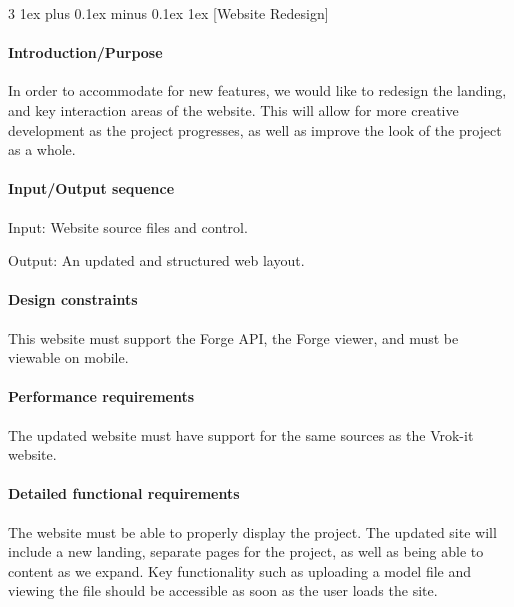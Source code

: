 \documentclass[letterpaper, 10pt, draftclsnofoot, compsoc, onecolumn]{IEEEtran}
\makeatletter
\def\subsubsection{\@startsection{subsubsection}%
                                 {3}%
                                 {\z@}%
                                 {1ex plus 0.1ex minus 0.1ex}%
                                 {1ex}%
                                 {\normalfont\normalsize}}%
\makeatother
\begin{document}

\subsubsection[{Website Redesign}]{\rmfamily\bfseries\color{black} }

\paragraph[Introduction/Purpose of this
feature]{\rmfamily\bfseries\color{black}
Introduction/Purpose }
	In order to accommodate for new features, we would like to redesign the landing, and key interaction areas of the website. 
	This will allow for more creative development as the project progresses, as well as improve the look of the project as a whole.


\paragraph[Input/Output sequence]{\rmfamily\bfseries\color{black}
Input/Output sequence }
	Input: Website source files and control. 
	
	Output: An updated and structured web layout.

\paragraph[Design constraints]{\rmfamily\bfseries\color{black} Design
constraints }
	This website must support the Forge API, the Forge viewer, and must be viewable on mobile. 

\paragraph[Performance requirements]{\rmfamily\bfseries\color{black}
Performance requirements }
	The updated website must have support for the same sources as the Vrok-it website.

\paragraph[Detailed functional requirements]{\rmfamily\bfseries\color{black}
Detailed functional requirements }
	The website must be able to properly display the project. The updated site will include a new landing,
	separate pages for the project, as well as being able to content as we expand. Key functionality such as uploading
	a model file and viewing the file should be accessible as soon as the user loads the site.   
\end{document}
